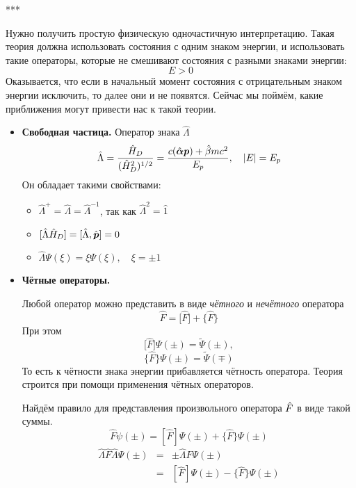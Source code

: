 ***

Нужно получить простую физическую одночастичную интерпретацию. Такая теория должна использовать состояния с одним знаком энергии, и использовать такие операторы, которые не смешивают состояния с разными знаками энергии:
$$
    E > 0
$$ 
Оказывается, что если в начальный момент состояния с отрицательным знаком энергии исключить, то далее они и не появятся. Сейчас мы поймём, какие приближения могут привести нас к такой теории.

\begin{itemize}
  \item \textbf{Свободная частица.} Оператор знака $\hat \Lambda$
  $$
    \Hat \Lambda = \dfrac{\hat H_D}{(\hat H_D^2)^{1/2}} = \dfrac{c(\hat{\bf \alpha} \bf p) + \hat \beta m c^2}{E_p}, \quad |E| = E_p
  $$
  Он обладает такими свойствами:
  \begin{itemize}
    \item $\hat \Lambda^{+} = \hat \Lambda = \hat \Lambda^{-1}$, так как $\hat \Lambda^2 = \hat 1$
    \item $[\hat \Lambda \hat H_D] = [\hat \Lambda, \hat{\bf p}] = 0$
    \item $\hat \Lambda \Psi(\xi) = \xi \Psi(\xi), \quad \xi = \pm 1$
  \end{itemize}
  \item \textbf{Чётные операторы.}

    \Def
  Любой оператор можно представить в виде \emph{чётного} и \emph{нечётного} оператора
    $$
        \hat F = \big[\hat F\big] + \big\{ \hat F \big\}
    $$ 
  При этом
  $$
     \big[ \hat F \big] \Psi(\pm) = \tilde \Psi(\pm),
  $$
  $$
     \big\{ \hat F \big\} \Psi(\pm) = \tilde \Psi(\mp)
  $$
  То есть к чётности знака энергии прибавляется чётность оператора. Теория строится при помощи применения чётных операторов.
  
  Найдём правило для представления произвольного оператора $\Hat F$ в виде такой суммы.
  $$
    \hat F \psi(\pm) = [\hat F] \Psi(\pm) + \{\hat F\} \Psi(\pm)
  $$
  \def \La {\Lambda}
  \begin{eqnarray*}
    \hat \La \hat F \hat \La \Psi(\pm) &=& \pm \hat \La \hat F \Psi(\pm)\\
    &=& [\hat F] \Psi(\pm) - \{\hat F\} \Psi(\pm)
  \end{eqnarray*}
  

\end{itemize}

